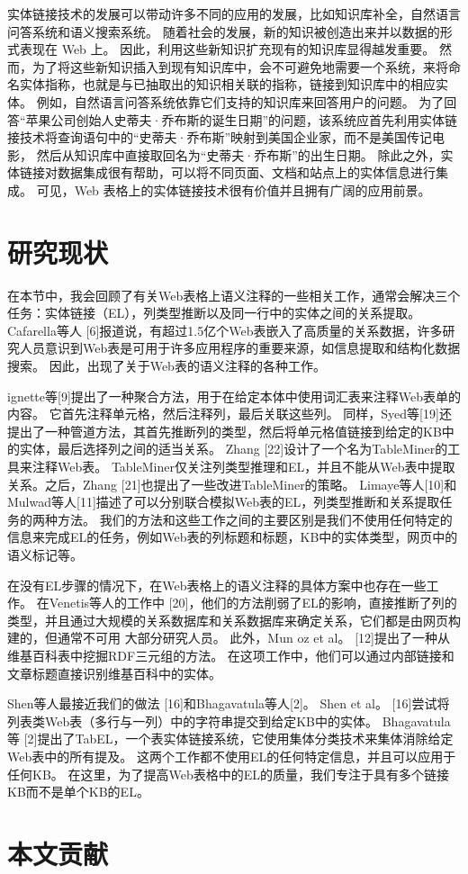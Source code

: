实体链接技术的发展可以带动许多不同的应用的发展，比如知识库补全，自然语言问答系统和语义搜索系统。
随着社会的发展，新的知识被创造出来并以数据的形式表现在 Web 上。
因此，利用这些新知识扩充现有的知识库显得越发重要。
然而，为了将这些新知识插入到现有知识库中，会不可避免地需要一个系统，来将命名实体指称，也就是与已抽取出的知识相关联的指称，链接到知识库中的相应实体。
例如，自然语言问答系统依靠它们支持的知识库来回答用户的问题。
为了回答``苹果公司创始人史蒂夫·乔布斯的诞生日期''的问题，该系统应首先利用实体链接技术将查询语句中的``史蒂夫·乔布斯''映射到美国企业家，而不是美国传记电影，
然后从知识库中直接取回名为``史蒂夫·乔布斯''的出生日期。
除此之外，实体链接对数据集成很有帮助，可以将不同页面、文档和站点上的实体信息进行集成。
可见，Web 表格上的实体链接技术很有价值并且拥有广阔的应用前景。\par


\section{研究现状}

在本节中，我会回顾了有关Web表格上语义注释的一些相关工作，通常会解决三个任务：实体链接（EL），列类型推断以及同一行中的实体之间的关系提取。 
Cafarella等人 [6]报道说，有超过1.5亿个Web表嵌入了高质量的关系数据，许多研究人员意识到Web表是可用于许多应用程序的重要来源，如信息提取和结构化数据搜索。 
因此，出现了关于Web表的语义注释的各种工作。\par

ignette等[9]提出了一种聚合方法，用于在给定本体中使用词汇表来注释Web表单的内容。
它首先注释单元格，然后注释列，最后关联这些列。
同样，Syed等[19]还提出了一种管道方法，其首先推断列的类型，然后将单元格值链接到给定的KB中的实体，最后选择列之间的适当关系。
 Zhang [22]设计了一个名为TableMiner的工具来注释Web表。 
 TableMiner仅关注列类型推理和EL，并且不能从Web表中提取关系。之后，Zhang [21]也提出了一些改进TableMiner的策略。 
 Limaye等人[10]和Mulwad等人[11]描述了可以分别联合模拟Web表的EL，列类型推断和关系提取任务的两种方法。
 我们的方法和这些工作之间的主要区别是我们不使用任何特定的信息来完成EL的任务，例如Web表的列标题和标题，KB中的实体类型，网页中的语义标记等。\par

在没有EL步骤的情况下，在Web表格上的语义注释的具体方案中也存在一些工作。 
在Venetis等人的工作中 [20]，他们的方法削弱了EL的影响，直接推断了列的类型，并且通过大规模的关系数据库和关系数据库来确定关系，它们都是由网页构建的，但通常不可用 大部分研究人员。 
此外，Mun oz et al。 [12]提出了一种从维基百科表中挖掘RDF三元组的方法。
 在这项工作中，他们可以通过内部链接和文章标题直接识别维基百科中的实体。\par

Shen等人最接近我们的做法 [16]和Bhagavatula等人[2]。
 Shen et al。 [16]尝试将列表类Web表（多行与一列）中的字符串提交到给定KB中的实体。
  Bhagavatula等 [2]提出了TabEL，一个表实体链接系统，它使用集体分类技术来集体消除给定Web表中的所有提及。 
  这两个工作都不使用EL的任何特定信息，并且可以应用于任何KB。 在这里，为了提高Web表格中的EL的质量，我们专注于具有多个链接KB而不是单个KB的EL。\par

\section{本文贡献}



